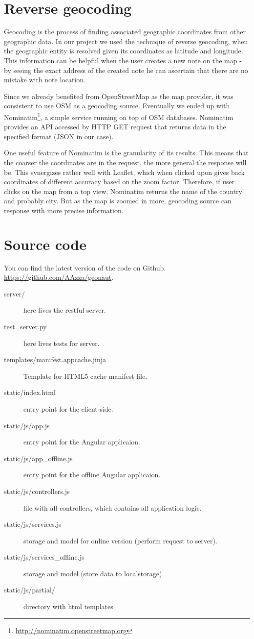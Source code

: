 \documentclass[12pt,a4paper]{article}
\begin{document}
\section{Reverse geocoding}

Geocoding is the process of finding associated geographic coordinates
from other geographic data. In our project we used the technique of
reverse geocoding, when the geographic entity is resolved given its
coordinates as latitude and longitude. This information can be helpful
when the user creates a new note on the map - by seeing the exact
address of the created note he can ascertain that there are no mistake
with note location.

Since we already benefited from OpenStreetMap as the map provider, it was
consistent to use OSM as a geocoding source. Eventually we ended up
with Nominatim\footnote{\url{http://nominatim.openstreetmap.org}}, a simple
service running on top of OSM databases. Nominatim provides an API
accessed by HTTP GET request that returns data in the specified format
(JSON in our case).

One useful feature of Nominatim is the granularity of its results.
This means that the coarser the coordinates are in the request, the
more general the response will be. This synergizes rather well with
Leaflet, which when clicked upon gives back coordinates of different
accuracy based on the zoom factor. Therefore, if user clicks on the
map from a top view, Nominatim returns the name of the country and
probably city. But as the map is zoomed in more, geocoding source can
response with more precise information.

\section{Source code}
    You can find the latest version of the code on Github.
    \url{https://github.com/AAzza/geonaut}.

    \begin{description}
        \item[server/] here lives the restful server.
        \item[test\_server.py] here lives tests for server.
        \item[templates/manifest.appcache.jinja] Template for HTML5 cache manifest file.
        \item[static/index.html] entry point for the client-side.
        \item[static/js/app.js] entry point for the Angular applicaion.
        \item[static/js/app\_offline.js] entry point for the offline Angular applicaion.
        \item[static/js/controllers.js] file with all controllers, which contains all application logic.
        \item[static/js/services.js] storage and model for online version (perform request to server).
        \item[static/js/services\_offline.js] storage and model (store data to localstorage).
        \item[static/js/partial/] directory with html templates
    \end{description}
\end{document}
